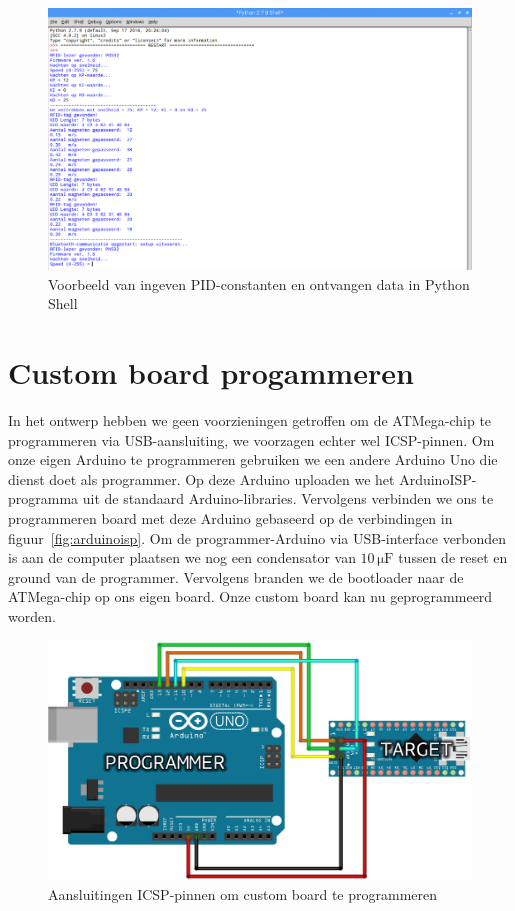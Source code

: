\begin{figure}[H]
	\centering
	\includegraphics[width=\textwidth]{bluetoothoutputvoorbeeldbijgesneden.png}
	\caption{Voorbeeld van ingeven PID-constanten en ontvangen data in Python Shell\label{fig:bluetoothoutput}}
\end{figure}

\section{Custom board progammeren}
In het ontwerp hebben we geen voorzieningen getroffen om de ATMega-chip te programmeren via USB-aansluiting, we voorzagen echter wel ICSP-pinnen. Om onze eigen Arduino te programmeren gebruiken we een andere Arduino Uno die dienst doet als programmer. Op deze Arduino uploaden we het ArduinoISP-programma uit de standaard Arduino-libraries. Vervolgens verbinden we ons te programmeren board met deze Arduino gebaseerd op de verbindingen in figuur~\vref{fig:arduinoisp}. Om de programmer-Arduino via USB-interface verbonden is aan de computer plaatsen we nog een condensator van $10\,\mathrm{\mu F}$ tussen de reset en ground van de programmer. Vervolgens branden we de bootloader naar de ATMega-chip op ons eigen board. Onze custom board kan nu geprogrammeerd worden.

\begin{figure}[H]
	\centering
	\includegraphics[width=\textwidth]{arduinoisp.png}
	\caption{Aansluitingen ICSP-pinnen om custom board te programmeren\label{fig:arduinoisp}}
\end{figure}

